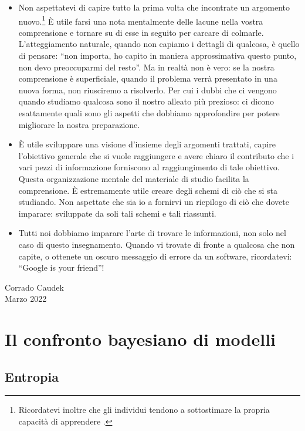 \documentclass[
  11pt,
]{krantz}
\theoremstyle{definition}
\theoremstyle{definition}
\theoremstyle{definition}
\theoremstyle{definition}
\theoremstyle{remark}
\begin{document}
\begin{itemize}
\item
  Non aspettatevi di capire tutto la prima volta che incontrate un argomento nuovo.\footnote{Ricordatevi inoltre che gli individui tendono a sottostimare la propria capacità di apprendere \citep{horn2021underestimating}.} È utile farsi una nota mentalmente delle lacune nella vostra comprensione e tornare su di esse in seguito per carcare di colmarle. L'atteggiamento naturale, quando non capiamo i dettagli di qualcosa, è quello di pensare: ``non importa, ho capito in maniera approssimativa questo punto, non devo preoccuparmi del resto''. Ma in realtà non è vero: se la nostra comprensione è superficiale, quando il problema verrà presentato in una nuova forma, non riusciremo a risolverlo. Per cui i dubbi che ci vengono quando studiamo qualcosa sono il nostro alleato più prezioso: ci dicono esattamente quali sono gli aspetti che dobbiamo approfondire per potere migliorare la nostra preparazione.
\item
  È utile sviluppare una visione d'insieme degli argomenti trattati, capire l'obiettivo generale che si vuole raggiungere e avere chiaro il contributo che i vari pezzi di informazione forniscono al raggiungimento di tale obiettivo. Questa organizzazione mentale del materiale di studio facilita la comprensione. È estremamente utile creare degli schemi di ciò che si sta studiando. Non aspettate che sia io a fornirvi un riepilogo di ciò che dovete imparare: sviluppate da soli tali schemi e tali riassunti.
\item
  Tutti noi dobbiamo imparare l'arte di trovare le informazioni, non solo nel caso di questo insegnamento. Quando vi trovate di fronte a qualcosa che non capite, o ottenete un oscuro messaggio di errore da un software, ricordatevi: ``Google is your friend''!
\end{itemize}

\begin{flushright}
Corrado Caudek\\
Marzo 2022 \end{flushright}

\mainmatter

\hypertarget{part-il-confronto-bayesiano-di-modelli}{%
\part{Il confronto bayesiano di modelli}\label{part-il-confronto-bayesiano-di-modelli}}

\hypertarget{ch:entropy}{%
\chapter{Entropia}\label{ch:entropy}}
\end{document}
